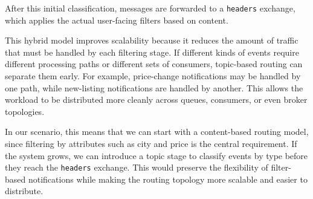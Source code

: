 After this initial classification, messages are forwarded to a \texttt{headers} exchange, which applies the actual user-facing filters based on content.

This hybrid model improves scalability because it reduces the amount of traffic that must be handled by each filtering stage. If different kinds of events require different processing paths or different sets of consumers, topic-based routing can separate them early. For example, price-change notifications may be handled by one path, while new-listing notifications are handled by another. This allows the workload to be distributed more cleanly across queues, consumers, or even broker topologies.

In our scenario, this means that we can start with a content-based routing model, since filtering by attributes such as city and price is the central requirement. If the system grows, we can introduce a topic stage to classify events by type before they reach the \texttt{headers} exchange. This would preserve the flexibility of filter-based notifications while making the routing topology more scalable and easier to distribute.
